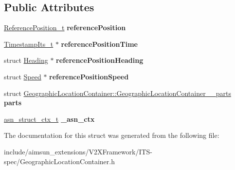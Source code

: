\subsection*{Public Attributes}
\begin{DoxyCompactItemize}
\item 
\hyperlink{structReferencePosition}{Reference\+Position\+\_\+t} {\bfseries reference\+Position}\hypertarget{structGeographicLocationContainer_af97aaaf0d8183aab3cfec3a24e67b2e6}{}\label{structGeographicLocationContainer_af97aaaf0d8183aab3cfec3a24e67b2e6}

\item 
\hyperlink{structASN____PRIMITIVE__TYPE__s}{Timestamp\+Its\+\_\+t} $\ast$ {\bfseries reference\+Position\+Time}\hypertarget{structGeographicLocationContainer_a85db0ac93ba23acc07f99f879ead5403}{}\label{structGeographicLocationContainer_a85db0ac93ba23acc07f99f879ead5403}

\item 
struct \hyperlink{structHeading}{Heading} $\ast$ {\bfseries reference\+Position\+Heading}\hypertarget{structGeographicLocationContainer_acc991400e78956fabc357181ec4e30e2}{}\label{structGeographicLocationContainer_acc991400e78956fabc357181ec4e30e2}

\item 
struct \hyperlink{structSpeed}{Speed} $\ast$ {\bfseries reference\+Position\+Speed}\hypertarget{structGeographicLocationContainer_aca2760e174f7d6eacc38cd052dd1df33}{}\label{structGeographicLocationContainer_aca2760e174f7d6eacc38cd052dd1df33}

\item 
struct \hyperlink{structGeographicLocationContainer_1_1GeographicLocationContainer____parts}{Geographic\+Location\+Container\+::\+Geographic\+Location\+Container\+\_\+\+\_\+parts} {\bfseries parts}\hypertarget{structGeographicLocationContainer_a5bc325fb66b90ce58c5a5beda3ac78e8}{}\label{structGeographicLocationContainer_a5bc325fb66b90ce58c5a5beda3ac78e8}

\item 
\hyperlink{structasn__struct__ctx__s}{asn\+\_\+struct\+\_\+ctx\+\_\+t} {\bfseries \+\_\+asn\+\_\+ctx}\hypertarget{structGeographicLocationContainer_a985f0731a3900bf573fa8481d3e8dab1}{}\label{structGeographicLocationContainer_a985f0731a3900bf573fa8481d3e8dab1}

\end{DoxyCompactItemize}


The documentation for this struct was generated from the following file\+:\begin{DoxyCompactItemize}
\item 
include/aimsun\+\_\+extensions/\+V2\+X\+Framework/\+I\+T\+S-\/spec/Geographic\+Location\+Container.\+h\end{DoxyCompactItemize}
